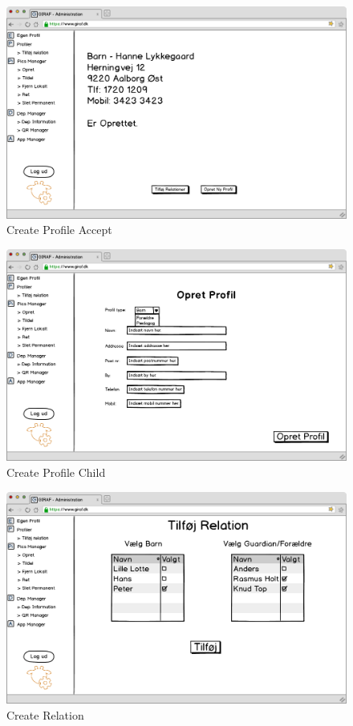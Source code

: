 \begin{figure}[p]
\centering
\includegraphics[width=1\textwidth]{images/mockup/opretProfilAccept.png}
\caption{Create Profile Accept}
\label{fig:create_profile_accept}
\end{figure}



\begin{figure}[p]
\centering
\includegraphics[width=1\textwidth]{images/mockup/opretProfilBarn.png}
\caption{Create Profile Child}
\label{fig:create_profile_child}
\end{figure}

\newpage

\begin{figure}[p]
\centering
\includegraphics[width=1\textwidth]{images/mockup/opretRelation.png}
\caption{Create Relation}
\label{fig:create_relation}
\end{figure}

